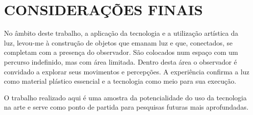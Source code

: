 \chapter{CONSIDERAÇÕES FINAIS}

No âmbito deste trabalho, a aplicação da tecnologia e a utilização artística da luz, levou-me à construção de objetos que emanam luz e que, conectados, se completam com a presença do observador. São colocados num espaço com um percurso indefinido, mas com área limitada. Dentro desta área o observador é convidado a explorar seus movimentos e percepções. A experiência confirma a luz como material plástico essencial e a tecnologia como meio para sua execução.

O trabalho realizado aqui é uma amostra da potencialidade do uso da tecnologia na arte e serve como ponto de partida para pesquisas futuras mais aprofundadas.
